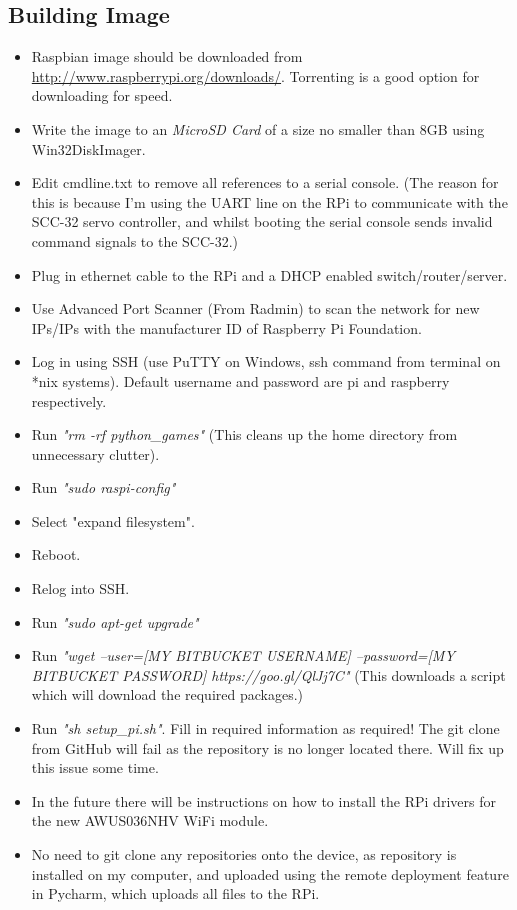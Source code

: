 			\subsection{Building Image}
            \label{raspbian_install}
				\begin{itemize}
					\item Raspbian image should be downloaded from \url{http://www.raspberrypi.org/downloads/}. Torrenting is a good option for downloading for speed.
					\item Write the image to an \textit{MicroSD Card} of a size no smaller than 8GB using Win32DiskImager.
					\item Edit cmdline.txt to remove all references to a serial console. (The reason for this is because I'm using the UART line on the RPi to communicate with the SCC-32 servo controller, and whilst booting the serial console sends invalid command signals to the SCC-32.)
					\item Plug in ethernet cable to the RPi and a DHCP enabled switch/router/server.
					\item Use Advanced Port Scanner (From Radmin) to scan the network for new IPs/IPs with the manufacturer ID of Raspberry Pi Foundation.
					\item Log in using SSH (use PuTTY on Windows, ssh command from terminal on *nix systems). Default username and password are pi and raspberry respectively.
					\item Run \textit{"rm -rf python\_games"} (This cleans up the home directory from unnecessary clutter).
					\item Run \textit{"sudo raspi-config"}
					\item Select "expand filesystem".
					\item Reboot.
					\item Relog into SSH.
					\item Run \textit{"sudo apt-get upgrade"}
					\item Run \textit{"wget --user=[MY BITBUCKET USERNAME] --password=[MY BITBUCKET PASSWORD] https://goo.gl/QlJj7C"} (This downloads a script which will download the required packages.)
					\item Run \textit{"sh setup\_pi.sh"}. Fill in required information as required! The git clone from GitHub will fail as the repository is no longer located there. Will fix up this issue some time.
					\item In the future there will be instructions on how to install the RPi drivers for the new AWUS036NHV WiFi module.
					\item No need to git clone any repositories onto the device, as repository is installed on my computer, and uploaded using the remote deployment feature in Pycharm, which uploads all files to the RPi.
					
				\end{itemize}
			
